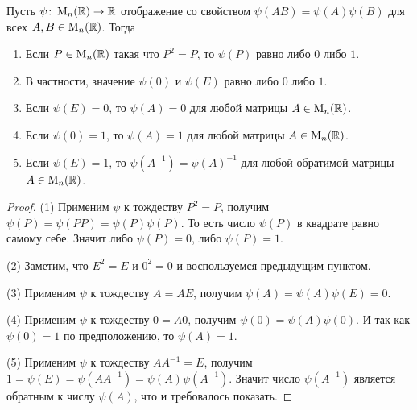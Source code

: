 \begin{claim}
Пусть $\psi\colon \operatorname{M}_{n}(\mathbb R)\to \mathbb R$ отображение со свойством $\psi(AB) = \psi(A)\psi(B)$ для всех $A,B\in\operatorname{M}_{n}(\mathbb R)$.
Тогда
\begin{enumerate}
\item Если $P\in \operatorname{M}_{n}(\mathbb R)$ такая что $P^2 = P$, то $\psi(P)$ равно либо $0$ либо $1$.

\item В частности, значение $\psi(0)$ и $\psi(E)$ равно либо $0$ либо $1$.

\item Если $\psi(E) = 0$, то $\psi(A) = 0$ для любой матрицы $A\in\operatorname{M}_{n}(\mathbb R)$.

\item Если $\psi(0) = 1$, то $\psi(A) = 1$ для любой матрицы $A\in\operatorname{M}_{n}(\mathbb R)$.

\item Если $\psi(E) = 1$, то $\psi(A^{-1}) = \psi(A)^{-1}$ для любой обратимой матрицы $A\in\operatorname{M}_{n}(\mathbb R)$.
\end{enumerate}
\end{claim}
\begin{proof}

(1) Применим $\psi$ к тождеству $P^2 = P$, получим $\psi(P) = \psi(P P) = \psi(P)\psi(P)$.
То есть число $\psi(P)$ в квадрате равно самому себе.
Значит либо $\psi(P) = 0$, либо $\psi(P) = 1$.

(2) Заметим, что $E^2 = E$ и $0^2 = 0$ и воспользуемся предыдущим пунктом.

(3) Применим $\psi$ к тождеству $A = A E$, получим $\psi(A) = \psi(A)\psi(E) = 0$.

(4) Применим $\psi$ к тождеству $0 = A 0$, получим $\psi(0) = \psi(A) \psi(0)$.
И так как $\psi(0) =1$ по предположению, то $\psi(A) = 1$.

(5) Применим $\psi$ к тождеству $A A^{-1} = E$, получим $1 = \psi(E) = \psi(AA^{-1})=\psi(A)\psi(A^{-1})$.
Значит число $\psi(A^{-1})$ является обратным к числу $\psi(A)$, что и требовалось показать.
\end{proof}

